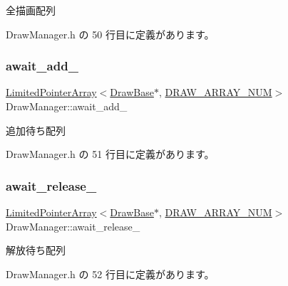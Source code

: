 全描画配列 



 Draw\+Manager.\+h の 50 行目に定義があります。

\mbox{\label{class_draw_manager_aa6a8468dd4469cde2cf162b91a5c1faf}} 
\subsubsection{\texorpdfstring{await\+\_\+add\+\_\+}{await\_add\_}}
{\footnotesize\ttfamily \mbox{\hyperlink{class_limited_pointer_array}{Limited\+Pointer\+Array}}$<$\mbox{\hyperlink{class_draw_base}{Draw\+Base}}$\ast$, \mbox{\hyperlink{class_draw_manager_ad4326cddcb1cc4cec198c4f8069b81f0}{D\+R\+A\+W\+\_\+\+A\+R\+R\+A\+Y\+\_\+\+N\+UM}}$>$ Draw\+Manager\+::await\+\_\+add\+\_\+\hspace{0.3cm}{\ttfamily [private]}}



追加待ち配列 



 Draw\+Manager.\+h の 51 行目に定義があります。

\mbox{\label{class_draw_manager_a59fa29ded26b3609545a04b5c6927824}} 
\subsubsection{\texorpdfstring{await\+\_\+release\+\_\+}{await\_release\_}}
{\footnotesize\ttfamily \mbox{\hyperlink{class_limited_pointer_array}{Limited\+Pointer\+Array}}$<$\mbox{\hyperlink{class_draw_base}{Draw\+Base}}$\ast$, \mbox{\hyperlink{class_draw_manager_ad4326cddcb1cc4cec198c4f8069b81f0}{D\+R\+A\+W\+\_\+\+A\+R\+R\+A\+Y\+\_\+\+N\+UM}}$>$ Draw\+Manager\+::await\+\_\+release\+\_\+\hspace{0.3cm}{\ttfamily [private]}}



解放待ち配列 



 Draw\+Manager.\+h の 52 行目に定義があります。

\mbox{\label{class_draw_manager_a53e3e9c0794c049fde69e7e5603df22f}} 
